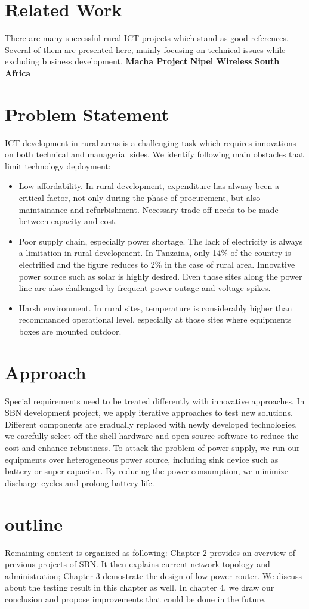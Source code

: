 \section{Related Work}
There are many successful rural ICT projects which stand as good references. Several of them are presented here, mainly focusing on technical issues while excluding business development.
\textbf{Macha Project}
\textbf{Nipel Wireless}
\textbf{South Africa}

\section{Problem Statement}
ICT development in rural areas is a challenging task which requires innovations on both technical and managerial sides. We identify following main obstacles that limit technology deployment:
\begin{itemize}
\item Low affordability. In rural development, expenditure has alwasy been a critical factor, not only during the phase of procurement, but also maintainance and refurbishment. Necessary trade-off needs to be made between capacity and cost.
\item Poor supply chain, especially power shortage. The lack of electricity is always a limitation in rural development. In Tanzaina, only 14\% of the country is electrified and the figure reduces to 2\% in the case of rural area\cite{XXX}. Innovative power source such as solar is highly desired. Even those sites along the power line are also challenged by frequent power outage and voltage spikes.
\item Harsh environment. In rural sites, temperature is considerably higher than recommanded operational level, especially at those sites where equipments boxes are mounted outdoor.
\end{itemize}

\section{Approach}
Special requirements need to be treated differently with innovative approaches. In SBN development project, we apply iterative approaches to test new solutions. Different components are gradually replaced with newly developed technologies. we carefully select off-the-shell hardware and open source software to reduce the cost and enhance rebustness. To attack the problem of power supply, we run our equipments over heterogeneous power source, including sink device such as battery or super capacitor. By reducing the power consumption, we minimize discharge cycles and prolong battery life.

\section{outline}
Remaining content is organized as following: Chapter 2 provides an overview of previous projects of SBN. It then explains current network topology and administration; Chapter 3 demostrate the design of low power router. We discuss about the testing result in this chapter as well. In chapter 4, we draw our conclusion and propose improvements that could be done in the future.
